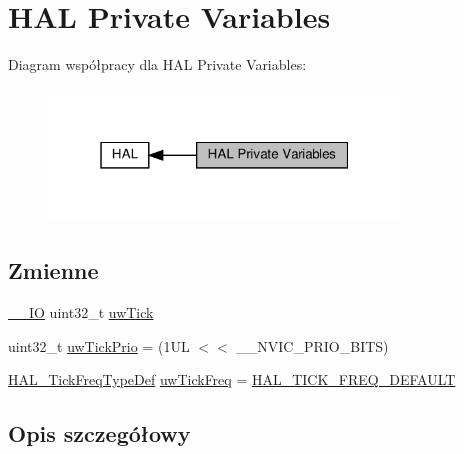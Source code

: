 \hypertarget{group___h_a_l___private___variables}{}\section{H\+AL Private Variables}
\label{group___h_a_l___private___variables}
Diagram współpracy dla H\+AL Private Variables\+:\nopagebreak
\begin{figure}[H]
\begin{center}
\leavevmode
\includegraphics[width=265pt]{group___h_a_l___private___variables}
\end{center}
\end{figure}
\subsection*{Zmienne}
\begin{DoxyCompactItemize}
\item 
\hyperlink{core__sc300_8h_aec43007d9998a0a0e01faede4133d6be}{\+\_\+\+\_\+\+IO} uint32\+\_\+t \hyperlink{group___h_a_l___private___variables_ga9d411ea525781e633bf7ea7ef2f90728}{uw\+Tick}
\item 
uint32\+\_\+t \hyperlink{group___h_a_l___private___variables_ga3000c5e83924ed2debb1849c738d4be2}{uw\+Tick\+Prio} = (1\+U\+L $<$$<$ \+\_\+\+\_\+\+N\+V\+I\+C\+\_\+\+P\+R\+I\+O\+\_\+\+B\+I\+T\+S)
\item 
\hyperlink{group___h_a_l___t_i_c_k___f_r_e_q_gab36ec81674817249c46734772ff3b73a}{H\+A\+L\+\_\+\+Tick\+Freq\+Type\+Def} \hyperlink{group___h_a_l___private___variables_ga84a0c55c4d0bff06a085b4fcfd6531cd}{uw\+Tick\+Freq} = \hyperlink{group___h_a_l___t_i_c_k___f_r_e_q_ggab36ec81674817249c46734772ff3b73aa94e043d780eb1c36291338f6d6314e42}{H\+A\+L\+\_\+\+T\+I\+C\+K\+\_\+\+F\+R\+E\+Q\+\_\+\+D\+E\+F\+A\+U\+LT}
\end{DoxyCompactItemize}


\subsection{Opis szczegółowy}


